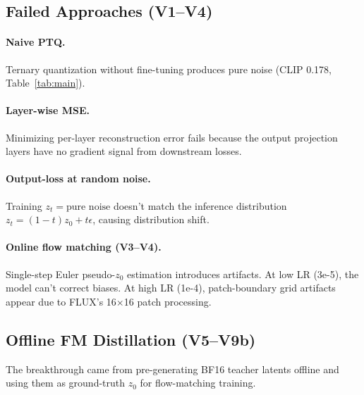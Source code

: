 \documentclass[10pt,twocolumn]{article}
\begin{document}
\subsection{Failed Approaches (V1--V4)}

\paragraph{Naive PTQ.} Ternary quantization without fine-tuning produces pure noise (CLIP 0.178, Table~\ref{tab:main}).

\paragraph{Layer-wise MSE.} Minimizing per-layer reconstruction error fails because the output projection layers have no gradient signal from downstream losses.

\paragraph{Output-loss at random noise.} Training $z_t = \text{pure noise}$ doesn't match the inference distribution $z_t = (1-t)z_0 + t\epsilon$, causing distribution shift.

\paragraph{Online flow matching (V3--V4).} Single-step Euler pseudo-$z_0$ estimation introduces artifacts.
At low LR (3e-5), the model can't correct biases.
At high LR (1e-4), patch-boundary grid artifacts appear due to FLUX's 16$\times$16 patch processing.

\subsection{Offline FM Distillation (V5--V9b)}

The breakthrough came from pre-generating BF16 teacher latents offline and using them as ground-truth $z_0$ for flow-matching training.
\end{document}
